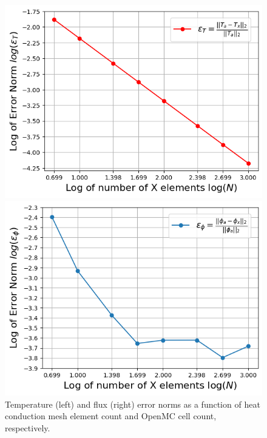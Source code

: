 \documentclass[letterpaper]{mc2023}
\begin{document}
\begin{figure}[H]
    \centering
    \begin{minipage}[b]{0.45\linewidth}
        \includegraphics[width=\linewidth]{figures/temp_error_norms.png}
    \end{minipage}
    \begin{minipage}[b]{0.45\linewidth}
        \includegraphics[width=\linewidth]{figures/flux_error_norms.png}
    \end{minipage}
    \caption{Temperature (left) and flux (right) error norms as a function of heat conduction mesh element count and OpenMC cell count, respectively.}
    \label{fig:error_study}
\end{figure}
\end{document}
